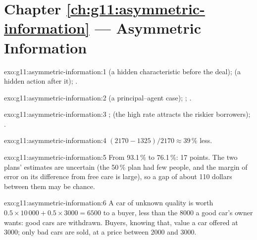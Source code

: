 \section*{Chapter \ref{ch:g11:asymmetric-information} --- Asymmetric Information}

\begin{solution}{exo:g11:asymmetric-information:1}
 (a hidden characteristic before the deal);  (a hidden action after it); .
\end{solution}

\begin{solution}{exo:g11:asymmetric-information:2}
 (a principal--agent case); ; .
\end{solution}

\begin{solution}{exo:g11:asymmetric-information:3}
;  (the high rate attracts the riskier borrowers); .
\end{solution}

\begin{solution}{exo:g11:asymmetric-information:4}
$(2170 - 1325)/2170 \approx 39\,\%$ less.
\end{solution}

\begin{solution}{exo:g11:asymmetric-information:5}
From 93.1\,\% to 76.1\,\%: 17 points. The two plans' estimates are uncertain (the 50\,\% plan had few people, and the margin of error on its difference from free care is
large), so a gap of about 110 dollars between them may be chance.
\end{solution}

\begin{solution}{exo:g11:asymmetric-information:6}
A car of unknown quality is worth $0.5 \times 10\,000 + 0.5 \times 3000 = 6500$ to a buyer, less than the 8000 a good car's owner wants: good cars are withdrawn. Buyers,
knowing that, value a car offered at 3000; only bad cars are sold, at a price between 2000 and 3000.
\end{solution}

